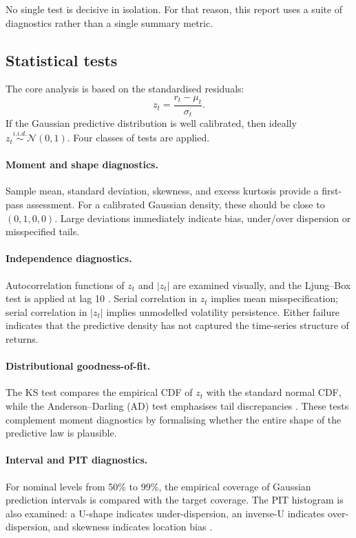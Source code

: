 \documentclass[%
 amsmath,amssymb,
 aps,
 pra,
 floatfix,
 raggedbottom,
 nofootinbib,
12pt,]{revtex4-2}
\begin{document}
No single test is decisive in isolation.
For that reason, this report uses a suite of diagnostics rather than a single summary metric.

\subsection{Statistical tests}

The core analysis is based on the standardised residuals:
\begin{equation}
    z_t = \frac{r_t - \mu_t}{\sigma_t}.
    \label{eq:z}
\end{equation}
If the Gaussian predictive distribution is well calibrated, then ideally $z_t \overset{i.i.d.}{\sim} \mathcal{N}(0,1)$.
Four classes of tests are applied.

\paragraph{Moment and shape diagnostics.}
Sample mean, standard deviation, skewness, and excess kurtosis provide a first-pass assessment.
For a calibrated Gaussian density, these should be close to $(0,1,0,0)$.
Large deviations immediately indicate bias, under/over dispersion or misspecified tails.

\paragraph{Independence diagnostics.}
Autocorrelation functions of $z_t$ and $|z_t|$ are examined visually, and the Ljung--Box test is applied at lag 10 \citep{ljung1978measure}.
Serial correlation in $z_t$ implies mean misspecification; serial correlation in $|z_t|$ implies unmodelled volatility persistence.
Either failure indicates that the predictive density has not captured the time-series structure of returns.

\paragraph{Distributional goodness-of-fit.}
The KS test compares the empirical CDF of $z_t$ with the standard normal CDF, while the Anderson--Darling (AD) test emphasises tail discrepancies \citep{anderson1952asymptotic}.
These tests complement moment diagnostics by formalising whether the entire shape of the predictive law is plausible.

\paragraph{Interval and PIT diagnostics.}
For nominal levels from 50\% to 99\%, the empirical coverage of Gaussian prediction intervals is compared with the target coverage.
The PIT histogram is also examined: a U-shape indicates under-dispersion, an inverse-U indicates over-dispersion, and skewness indicates location bias \citep{diebold1998evaluating}.
\end{document}
